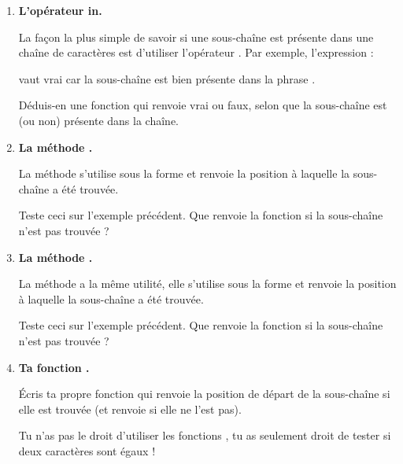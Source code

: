 \documentclass[11pt,class=report,crop=false]{standalone}
\begin{document}
\begin{activite}[Chercher]


\begin{enumerate}
  \item \textbf{L'opérateur \og{}in\fg{}.}
  
  
  La façon la plus simple de savoir si une sous-chaîne est présente dans une chaîne de caractères est d'utiliser l'opérateur \og{}\fg{}. Par exemple, l'expression : 
  
  vaut \og{}vrai\fg{} car la sous-chaîne  est bien présente dans la phrase
  . 
  
  Déduis-en une fonction  qui renvoie \og{}vrai\fg{} ou \og{}faux\fg{}, selon que la sous-chaîne est (ou non) présente dans la chaîne.
  
  \item \textbf{La méthode .}
  
  
  La méthode  s'utilise sous la forme  et renvoie la position à laquelle la sous-chaîne a été trouvée. 
  
  Teste ceci sur l'exemple précédent. Que renvoie la fonction si la sous-chaîne n'est pas trouvée ?
 
   \item \textbf{La méthode .}
  
  
  La méthode  a la même utilité, elle s'utilise sous la forme  et renvoie la position à laquelle la sous-chaîne a été trouvée. 

  Teste ceci sur l'exemple précédent. Que renvoie la fonction si la sous-chaîne n'est pas trouvée ?
 
  
  \item \textbf{Ta fonction .}
  
  Écris ta propre fonction  qui renvoie la position de départ de la sous-chaîne si elle est trouvée (et renvoie  si elle ne l'est pas).
  
  Tu n'as pas le droit d'utiliser les fonctions \Python{}, tu as seulement droit de tester si deux caractères sont égaux !  
  
\end{enumerate}   
     
\end{activite}
\end{document}
